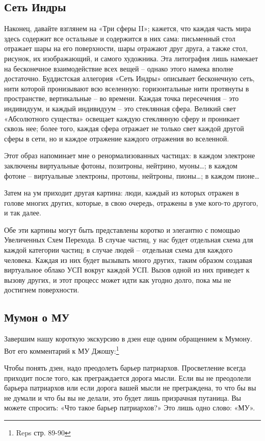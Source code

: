 \documentclass[../main.tex]{subfiles}
\begin{document}
\subsection{Сеть Индры}

Наконец, давайте взглянем на «Три сферы II»; кажется, что каждая часть мира здесь содержит все остальные и содержится в них сама: письменный стол отражает шары на его поверхности, шары отражают друг друга, а также стол, рисунок, их изображающий, и самого художника. Эта литография лишь намекает на бесконечное взаимодействие всех вещей \--- однако этого намека вполне достаточно. Буддистская аллегория «Сеть Индры» описывает бесконечную сеть, нити которой пронизывают всю вселенную: горизонтальные нити протянуты в пространстве, вертикальные \--- во времени. Каждая точка пересечения \--- это индивидуум, и каждый индивидуум \--- это стеклянная сфера. Великий свет «Абсолютного существа» освещает каждую стеклянную сферу и проникает сквозь нее; более того, каждая сфера отражает не только свет каждой другой сферы в сети, но и каждое отражение каждого отражения во вселенной.

Этот образ напоминает мне о ренормализованных частицах: в каждом электроне заключены виртуальные фотоны, позитроны, нейтрино, муоны\ldots; в каждом фотоне \--- виртуальные электроны, протоны, нейтроны, пионы\ldots; в каждом пионе\ldots{}

Затем на ум приходит другая картина: люди, каждый из которых отражен в голове многих других, которые, в свою очередь, отражены в уме кого-то другого, и так далее.

Обе эти картины могут быть представлены коротко и элегантно с помощью Увеличенных Схем Перехода. В случае частиц, у нас будет отдельная схема для каждой категории частиц; в случае людей \--- отдельная схема для каждого человека. Каждая из них будет вызывать много других, таким образом создавая виртуальное облако УСП вокруг каждой УСП\@. Вызов одной из них приведет к вызову других, и этот процесс может идти как угодно долго, пока мы не достигнем поверхности.


\subsection{Мумон о МУ}

Завершим нашу короткую экскурсию в дзен еще одним обращением к Мумону. Вот его комментарий к МУ Джошу:\footnote{Reps стр. 89-90}

Чтобы понять дзен, надо преодолеть барьер патриархов. Просветление всегда приходит после того, как преграждается дорога мысли. Если вы не преодолели барьера патриархов или если дорога вашей мысли не преграждена, то что бы вы не думали и что бы вы не делали, это будет лишь призрачная путаница. Вы можете спросить: «Что такое барьер патриархов?» Это лишь одно слово: «МУ».
\end{document}
